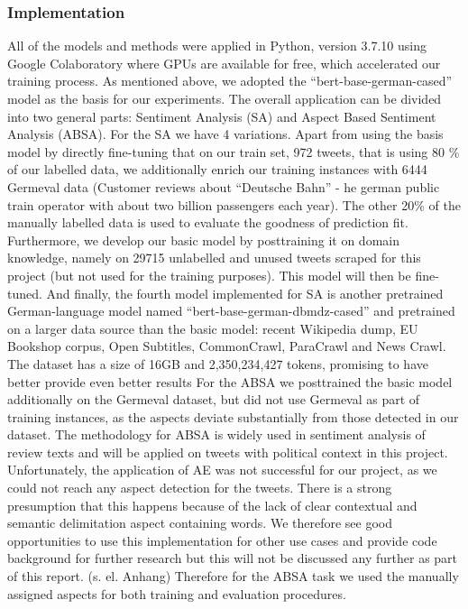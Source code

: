 
\subsubsection{Implementation}
\label{bert_implementation}

All of the models and methods were applied in Python, version 3.7.10 
using Google Colaboratory 
where GPUs are available for free, which accelerated our training process.
As mentioned above, we adopted the “bert-base-german-cased” model as the basis 
for our experiments.
The overall application can be divided into two general parts: Sentiment 
Analysis (SA) and Aspect Based Sentiment Analysis (ABSA). 
For the SA we have 4 variations. Apart from using the basis model by directly 
fine-tuning that on our train set, 972 tweets, that is using 80 \% of our 
labelled data, we additionally enrich our training instances with 6444 Germeval 
data (Customer reviews about “Deutsche Bahn” - he german public train operator 
with about two billion passengers each year). The other 20\% of the manually 
labelled data is used to evaluate the goodness of prediction fit. Furthermore, 
we develop our basic model by posttraining it on domain knowledge, namely on 
29715 unlabelled and unused tweets scraped for this project (but not used for 
the training purposes). This model will then be fine-tuned. And finally, the 
fourth model implemented for SA is another pretrained German-language model 
named “bert-base-german-dbmdz-cased” and pretrained on a larger data source 
than the basic model: recent Wikipedia dump, EU Bookshop corpus, Open Subtitles, 
CommonCrawl, ParaCrawl and News Crawl. The dataset has a size of 16GB and 
2,350,234,427 tokens, promising to have better provide even better results 
For the ABSA we posttrained the basic model additionally on the Germeval 
dataset, but did not use Germeval as part of training instances, as the aspects 
deviate substantially from those detected in our dataset. 
The methodology for ABSA is widely used in sentiment analysis of review texts 
and will be applied on tweets with political context in this project. 
Unfortunately, the application of AE was not successful for our project, as we 
could not reach any aspect detection for the tweets. There is a strong 
presumption that this happens because of the lack of clear contextual and 
semantic delimitation aspect containing words. We therefore see good 
opportunities to use this implementation for other use cases and provide code 
background for further research but this will not be discussed any further as 
part of this report. (s. el. Anhang) Therefore for the ABSA task we used the 
manually assigned aspects for both training and evaluation procedures. 

